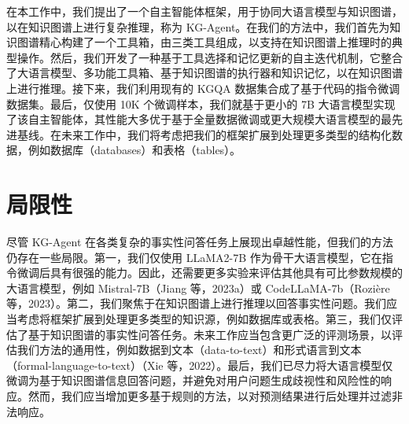 \documentclass[11pt,UTF8,fontset=fandol]{ctexart}
\begin{document}
在本工作中，我们提出了一个自主智能体框架，用于协同大语言模型与知识图谱，以在知识图谱上进行复杂推理，称为 KG-Agent。在我们的方法中，我们首先为知识图谱精心构建了一个工具箱，由三类工具组成，以支持在知识图谱上推理时的典型操作。然后，我们开发了一种基于工具选择和记忆更新的自主迭代机制，它整合了大语言模型、多功能工具箱、基于知识图谱的执行器和知识记忆，以在知识图谱上进行推理。接下来，我们利用现有的 KGQA 数据集合成了基于代码的指令微调数据集。最后，仅使用 10K 个微调样本，我们就基于更小的 7B 大语言模型实现了该自主智能体，其性能大多优于基于全量数据微调或更大规模大语言模型的最先进基线。在未来工作中，我们将考虑把我们的框架扩展到处理更多类型的结构化数据，例如数据库（databases）和表格（tables）。

\section*{局限性}

尽管 KG-Agent 在各类复杂的事实性问答任务上展现出卓越性能，但我们的方法仍存在一些局限。第一，我们仅使用 LLaMA2-7B 作为骨干大语言模型，它在指令微调后具有很强的能力。因此，还需要更多实验来评估其他具有可比参数规模的大语言模型，例如 Mistral-7B（Jiang 等，2023a）或 CodeLLaMA-7b（Rozière 等，2023）。第二，我们聚焦于在知识图谱上进行推理以回答事实性问题。我们应当考虑将框架扩展到处理更多类型的知识源，例如数据库或表格。第三，我们仅评估了基于知识图谱的事实性问答任务。未来工作应当包含更广泛的评测场景，以评估我们方法的通用性，例如数据到文本（data-to-text）和形式语言到文本（formal-language-to-text）（Xie 等，2022）。最后，我们已尽力将大语言模型仅微调为基于知识图谱信息回答问题，并避免对用户问题生成歧视性和风险性的响应。然而，我们应当增加更多基于规则的方法，以对预测结果进行后处理并过滤非法响应。
\end{document}
